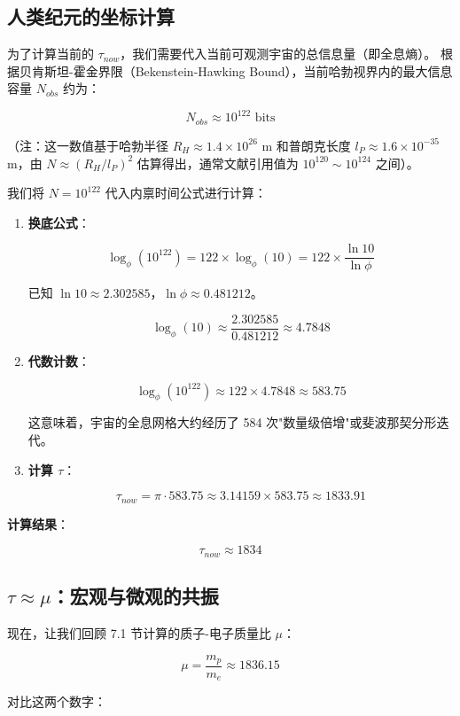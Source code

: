 \subsection{人类纪元的坐标计算}

为了计算当前的 $\tau_{now}$，我们需要代入当前可观测宇宙的总信息量（即全息熵）。
根据贝肯斯坦-霍金界限（Bekenstein-Hawking Bound），当前哈勃视界内的最大信息容量 $N_{obs}$ 约为：

\[N_{obs} \approx 10^{122} \text{ bits}\]

（注：这一数值基于哈勃半径 $R_H \approx 1.4 \times 10^{26}$ m 和普朗克长度 $l_P \approx 1.6 \times 10^{-35}$ m，由 $N \approx (R_H/l_P)^2$ 估算得出，通常文献引用值为 $10^{120} \sim 10^{124}$ 之间）。

我们将 $N = 10^{122}$ 代入内禀时间公式进行计算：

\begin{enumerate}
\item \textbf{换底公式}：

   \[\log_{\phi}(10^{122}) = 122 \times \log_{\phi}(10) = 122 \times \frac{\ln 10}{\ln \phi}\]

   已知 $\ln 10 \approx 2.302585$，$\ln \phi \approx 0.481212$。

   \[\log_{\phi}(10) \approx \frac{2.302585}{0.481212} \approx 4.7848\]

\item \textbf{代数计数}：

   \[\log_{\phi}(10^{122}) \approx 122 \times 4.7848 \approx 583.75\]

   这意味着，宇宙的全息网格大约经历了 584 次"数量级倍增"或斐波那契分形迭代。

\item \textbf{计算 $\tau$}：

   \[\tau_{now} = \pi \cdot 583.75 \approx 3.14159 \times 583.75 \approx 1833.91\]
\end{enumerate}

\textbf{计算结果}：

\[\tau_{now} \approx 1834\]

\subsection{$\tau \approx \mu$：宏观与微观的共振}

现在，让我们回顾 7.1 节计算的质子-电子质量比 $\mu$：

\[\mu = \frac{m_p}{m_e} \approx 1836.15\]

对比这两个数字：

